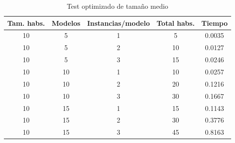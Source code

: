 \begin{table}[H]
\begin{center}
	\begin{tabular}{ | c | c | c | c | c | }
\hline
Tam. habs. & Modelos & Instancias/modelo & Total habs. & Tiempo \\ \hline 
10 & 5 & 1 & 5 & 0.0035 \\ 
10 & 5 & 2 & 10 & 0.0127 \\ 
10 & 5 & 3 & 15 & 0.0246 \\ 
10 & 10 & 1 & 10 & 0.0257 \\ 
10 & 10 & 2 & 20 & 0.1216 \\ 
10 & 10 & 3 & 30 & 0.1667 \\ 
10 & 15 & 1 & 15 & 0.1143 \\ 
10 & 15 & 2 & 30 & 0.3776 \\ 
10 & 15 & 3 & 45 & 0.8163 \\ 
\hline
	\end{tabular}
\end{center}
\caption{Test optimizado de tamaño medio}
\label{table:bsoptmedsamp}
\end{table}

